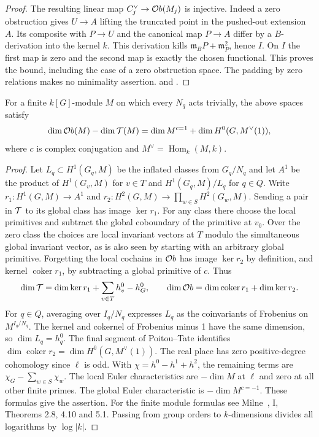 \begin{proof}
The resulting linear map \(C_j^\vee\to{\cal O}b(M_j)\) is injective.
Indeed a zero obstruction gives \(U\to A\) lifting the truncated
point in the pushed-out extension \(A\). Its composite with \(P\to U\)
and the canonical map \(P\to A\) differ by a \(B\)-derivation into
the kernel \(k\). This derivation kills
\(\mathfrak m_BP+\mathfrak m_P^2\), hence \(I\). On \(I\) the first
map is zero and the second map is exactly the chosen functional.
This proves the bound, including the case of a zero obstruction
space. The padding by zero relations makes no minimality assertion.
and .
\end{proof}

\begin{proposition}\label{dp:count}
For a finite \(k[G]\)-module \(M\) on which every \(N_q\) acts
trivially, the above spaces satisfy
\[
 \dim{\cal O}b(M)-\dim{\cal T}(M)=
 \dim M^{c=1}+\dim H^0(G,M^\vee(1)),
\]
where \(c\) is complex conjugation and \(M^\vee=\operatorname{Hom}_k(M,k)\).
\end{proposition}

\begin{proof}
Let \(L_q\subset H^1(G_q,M)\) be the inflated classes from
\(G_q/N_q\) and let \(A^1\) be the product of \(H^1(G_v,M)\)
for \(v\in T\) and \(H^1(G_q,M)/L_q\) for \(q\in Q\).
Write \(r_1:H^1(G,M)\to A^1\) and
\(r_2:H^2(G,M)\to\prod_{w\in S}H^2(G_w,M)\).
Sending a pair in \({\cal T}\) to its global class has image
\(\ker r_1\). For any class there choose the local primitives and
subtract the global coboundary of the primitive at \(v_0\).
Over the zero class the choices are local invariant vectors at
\(T\) modulo the simultaneous global invariant vector, as is also
seen by starting with an arbitrary global primitive. Forgetting the
local cochains in \({\cal O}b\) has image \(\ker r_2\) by definition,
and kernel \(\operatorname{coker}r_1\), by subtracting a global
primitive of \(c\). Thus
\[
 \dim{\cal T}=\dim\ker r_1+\sum_{v\in T}h^0_v-h^0_G,\qquad
 \dim{\cal O}b=\dim\operatorname{coker}r_1+\dim\ker r_2.
\]
For \(q\in Q\), averaging over \(I_q/N_q\) expresses \(L_q\)
as the coinvariants of Frobenius on \(M^{I_q/N_q}\).
The kernel and cokernel of Frobenius minus 1 have the same dimension,
so \(\dim L_q=h_q^0\). The final segment of Poitou--Tate identifies
\(\dim\operatorname{coker}r_2=\dim H^0(G,M^\vee(1))\).
The real place has zero positive-degree cohomology since \(\ell\)
is odd. With \(\chi=h^0-h^1+h^2\), the remaining terms are
\(\chi_G-\sum_{w\in S}\chi_w\). The local Euler characteristics
are \(-\dim M\) at \(\ell\) and zero at all other finite primes.
The global Euler characteristic is \(-\dim M^{c=-1}\).
These formulas give the assertion. For the finite module formulas
see Milne~\cite{milneADT},
I, Theorems 2.8, 4.10 and 5.1. Passing from group orders to
\(k\)-dimensions divides all logarithms by \(\log |k|\).
\end{proof}


